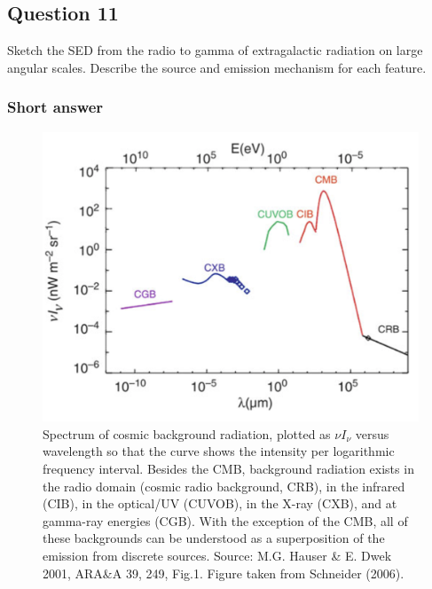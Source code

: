 \documentclass[a4paper,10pt]{article}
\begin{document}

\newpage
\subsection{Question 11}

Sketch the SED from the radio to gamma of extragalactic radiation on large angular scales. Describe the source and emission mechanism for each feature.

\subsubsection{Short answer}

\begin{figure}[h]
    \centering
    \includegraphics[width=14cm]{figures/DiffuseBackground.png}
    \caption{\footnotesize{Spectrum of cosmic background radiation, plotted as $\nu I_\nu$ versus wavelength so that the curve shows the intensity per logarithmic frequency interval. Besides the CMB, background radiation exists in the radio domain (cosmic radio background, CRB), in the infrared (CIB), in the optical/UV (CUVOB), in the X-ray (CXB), and at gamma-ray energies (CGB). With the exception of the CMB, all of these backgrounds can be understood as a superposition of the emission from discrete sources. Source: M.G. Hauser \& E. Dwek 2001, ARA\&A 39, 249, Fig.1. Figure taken from Schneider (2006).}}
    \label{fig:diffusebackground}
\end{figure}
\end{document}
